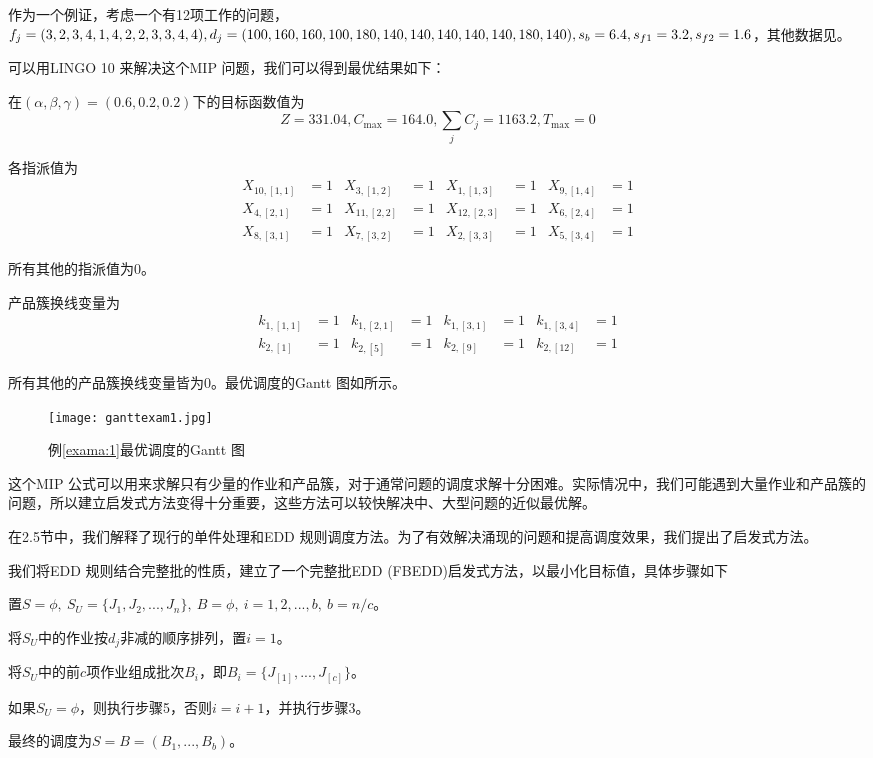 \begin{example}
作为一个例证，考虑一个有12项工作的问题，$f_j=(3,2,3,4,1,4,2,2,3,3,4,4),d_j=(100,160,160,100,\\
180,140,140,140,140,140,180,140),s_b=6.4,s_{f1}=3.2,s_{f2}=1.6$，其他数据见。\label{exama:1}
\end{example}

可以用LINGO 10 来解决这个MIP 问题，我们可以得到最优结果如下：

在$(\alpha,\beta,\gamma) = (0.6,0.2,0.2)$下的目标函数值为
$$Z = 331.04, C_{\max} = 164.0, {\textstyle\sum_j C_j = 1163.2}, T_{\max} = 0$$

各指派值为
\begin{align*}
 X_{10,[1,1]} & = 1 & X_{3,[1,2]} & = 1 & X_{1,[1,3]} & = 1 & X_{9,[1,4]} & = 1\\
 X_{4,[2,1]} & = 1 & X_{11,[2,2]} & = 1 & X_{12,[2,3]} & = 1 & X_{6,[2,4]} & = 1\\
 X_{8,[3,1]} & = 1 & X_{7,[3,2]} & = 1 & X_{2,[3,3]} & = 1 & X_{5,[3,4]} & = 1
\end{align*}

所有其他的指派值为0。

产品簇换线变量为
\begin{align*}
k_{1,[1,1]} & = 1 & k_{1,[2,1]} & = 1 & k_{1,[3,1]} & = 1 & k_{1,[3,4]} & = 1 \\
k_{2,[1]} & = 1 & k_{2,[5]} & = 1 & k_{2,[9]} & = 1 & k_{2,[12]} & = 1
\end{align*}

所有其他的产品簇换线变量皆为0。最优调度的Gantt 图如所示。
\begin{figure}[h]
\texttt{[image: ganttexam1.jpg]}
\caption{例\ref{exama:1}最优调度的Gantt 图\label{fig:gantt1}}
\end{figure}

这个MIP 公式可以用来求解只有少量的作业和产品簇，对于通常问题的调度求解十分困难。实际情况中，我们可能遇到大量作业和产品簇的问题，所以建立启发式方法变得十分重要，这些方法可以较快解决中、大型问题的近似最优解。

在2.5节中，我们解释了现行的单件处理和EDD 规则调度方法。为了有效解决涌现的问题和提高调度效果，我们提出了启发式方法。
\newcommand{\Step}{{\heiti 步骤}}

我们将EDD 规则结合完整批的性质，建立了一个完整批EDD (FBEDD)启发式方法，以最小化目标值，具体步骤如下

\begin{asparaenum}
\renewcommand{\labelenumi}{\heiti 步骤\theenumi~}
\item 置$S=\phi,\ S_U = \{J_1,J_2,...,J_n\},\ B=\phi,\ i=1,2,...,b,\ b = n/c$。
\item 将$S_U$中的作业按$d_j$非减的顺序排列，置$i=1$。
\item 将$S_U$中的前$c$项作业组成批次$B_i$，即$B_i = \{J_{[1]},...,J_{[c]}\}$。
\item 如果$S_U = \phi$，则执行\Step5，否则$i=i+1$，并执行\Step 3。
\item 最终的调度为$S=B=(B_1,...,B_b)$。
\end{asparaenum}

